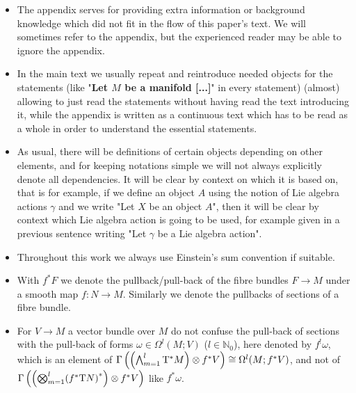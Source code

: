 \documentclass[a4paper,oneside,11pt,bibliography=totoc]{scrartcl}
\def\bas#1\eas{\begin{align*}#1\end{align*}}
\theoremstyle{plain}
\theoremstyle{remark}
\theoremstyle{definition}
\begin{document}
\begin{itemize}
	\item The appendix serves for providing extra information or background knowledge which did not fit in the flow of this paper's text. We will sometimes refer to the appendix, but the experienced reader may be able to ignore the appendix. 
	\item In the main text we usually repeat and reintroduce needed objects for the statements (like "\textbf{Let $M$ be a manifold [...]}" in every statement) (almost) allowing to just read the statements without having read the text introducing it, while the appendix is written as a continuous text which has to be read as a whole in order to understand the essential statements.
	\item As usual, there will be definitions of certain objects depending on other elements, and for keeping notations simple we will not always explicitly denote all dependencies. It will be clear by context on which it is based on, that is for example, if we define an object $A$ using the notion of Lie algebra actions $\gamma$ and we write "Let $X$ be an object $A$", then it will be clear by context which Lie algebra action is going to be used, for example given in a previous sentence writing "Let $\gamma$ be a Lie algebra action".
	\item Throughout this work we always use Einstein's sum convention if suitable.
	\item With $f^*F$ we denote the pullback/pull-back of the fibre bundles $F \to M$ under a smooth map $f: N \to M$. Similarly we denote the pullbacks of sections of a fibre bundle.
	\item For $V \to M$ a vector bundle over $M$ do not confuse the pull-back of sections with the pull-back of forms $\omega \in \Omega^l(M; V)$ ($l \in \mathbb{N}_0$), here denoted by $f^!\omega$, which is an element of $\Gamma\left( \mleft(\bigwedge_{m=1}^{l} \mathrm{T}^*M \mright) \otimes f^*V \right) \cong \Omega^l(M; f^*V)$, and not of $\Gamma\left( \mleft(\bigotimes_{m=1}^{l} \mleft(f^*\mathrm{T}N\mright)^*\mright) \otimes f^*V \right)$ like $f^*\omega$. 

\end{itemize}
\end{document}
